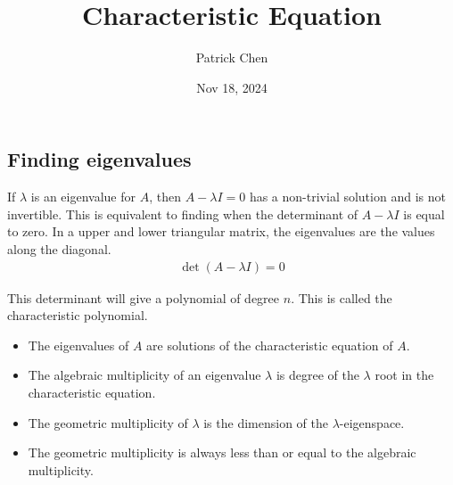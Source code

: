 \documentclass{article}
\title{Characteristic Equation}
\author{Patrick Chen}
\date{Nov 18, 2024}
\theoremstyle{mytheoremstyle}
\theoremstyle{mytheoremstyle}
\theoremstyle{myproblemstyle}
\begin{document}
    \maketitle

    \subsection*{Finding eigenvalues}
    If $\lambda$ is an eigenvalue for $A$, then $A-\lambda I=0$ has a
    non-trivial solution and is not invertible. This is equivalent to finding
    when the determinant of $A-\lambda I$ is equal to zero. In a upper and lower
    triangular matrix, the eigenvalues are the values along the diagonal.
    \begin{align*}
        \det(A-\lambda I) = 0
    \end{align*}

    This determinant will give a polynomial of degree $n$. This is called the
    characteristic polynomial.
    \begin{itemize}
        \item The eigenvalues of $A$ are solutions of the characteristic
            equation of $A$.
        \item The algebraic multiplicity of an eigenvalue $\lambda$ is degree of
            the $\lambda$ root in the characteristic equation.
        \item The geometric multiplicity of $\lambda$ is the dimension of the
            $\lambda$-eigenspace.
        \item The geometric multiplicity is always less than or equal to the
            algebraic multiplicity.
    \end{itemize}
\end{document}
